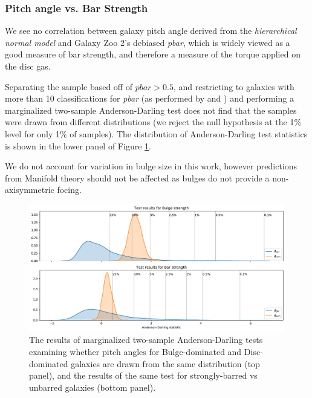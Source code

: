\subsubsection{Pitch angle vs. Bar Strength}
We see no correlation between galaxy pitch angle derived from the \textit{hierarchical normal model} and Galaxy Zoo 2's debiased \textit{pbar}, which is widely viewed as a good measure of bar strength, and therefore a measure of the torque applied on the disc gas.

Separating the sample based off of $\mathrm{\textit{pbar}} > 0.5$, and restricting to galaxies with more than 10 classifications for \textit{pbar} (as performed by \citealt{2011MNRAS.411.2026M} and \citealt{2017MNRAS.469.3363K}) and performing a marginalized two-sample Anderson-Darling test does not find that the samples were drawn from different distributions (we reject the null hypothesis at the 1\% level for only 1\% of samples). The distribution of Anderson-Darling test statistics is shown in the lower panel of Figure \ref{fig:ad-morphology-test}.

We do not account for variation in bulge size in this work, however predictions from Manifold theory should not be affected as bulges do not provide a non-axisymmetric focing.

\begin{figure}
  \includegraphics[width=17.7cm]{plots/bulge_bar_test_results.pdf}
  \caption{The results of marginalized two-sample Anderson-Darling tests examining whether pitch angles for Bulge-dominated and Disc-dominated galaxies are drawn from the same distribution (top panel), and the results of the same test for strongly-barred vs unbarred galaxies (bottom panel).}
  \label{fig:ad-morphology-test}
\end{figure}
